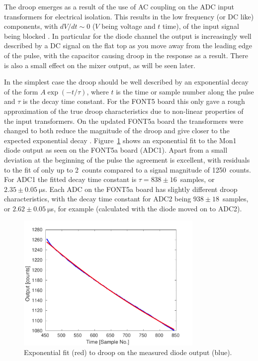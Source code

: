 The droop emerges as a result of the use of AC coupling on the ADC input transformers for electrical isolation. 
This results in the low frequency (or DC like) components, with  \({dV}/{dt}\sim0\) (\(V\) being voltage and \(t\) time), of the input signal being blocked \cite{acCoupling}. 
In particular for the diode channel the output is increasingly well described by a DC signal on the flat top as you move away from the leading edge of the pulse, with the capacitor causing droop in the response as a result. There is also a small effect on the mixer output, as will be seen later.

In the simplest case the droop should be well described by an exponential decay of the form \(A\exp\left(-t/\tau\right)\), where \(t\) is the time or sample number along the pulse and \(\tau\) is the decay time constant. For the FONT5 board this only gave a rough approximation of the true droop characteristics due to non-linear properties of the input transformers. On the updated FONT5a board the transformers were changed to both reduce the magnitude of the droop and give closer to the expected exponential decay \cite{colinPriv}. Figure~\ref{f:iirDiodeFit} shows an exponential fit to the Mon1 diode output as seen on the FONT5a board (ADC1). Apart from a small deviation at the beginning of the pulse the agreement is excellent, with residuals to the fit of only up to 2~counts compared to a signal magnitude of 1250~counts. For ADC1 the fitted decay time constant is \(\tau = 838\pm16\)~samples, or \(2.35\pm0.05~\mathrm{\mu}\)s. Each ADC on the FONT5a board has slightly different droop characteristics, with the decay time constant for ADC2 being \(938\pm18\)~samples, or \(2.62\pm0.05~\mathrm{\mu}\)s, for example (calculated with the diode moved on to ADC2).

\begin{figure}
  \centering
  \includegraphics[width=0.8\textwidth]{Figures/commissioning/iirDiodeFit}
  \caption{Exponential fit (red) to droop on the measured diode output (blue).}
  \label{f:iirDiodeFit}
\end{figure}

